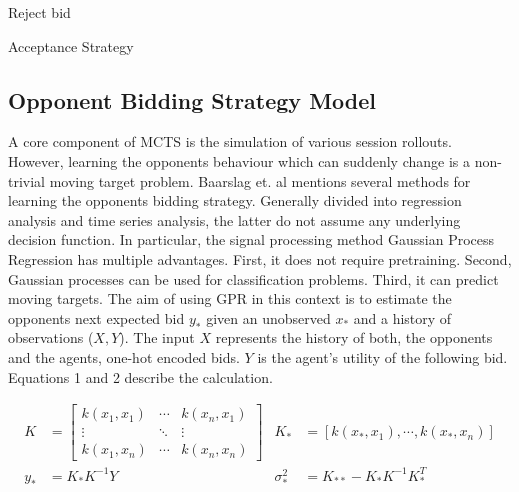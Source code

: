 \documentclass[a4paper,11pt]{article}
\theoremstyle{mytheor}
\begin{document}
\begin{algorithm}[H]
\SetAlgoNoEnd\SetAlgoNoLine
{}%
{Reject bid}
\caption{Acceptance Strategy}\label{alg:IR}
\end{algorithm}

\subsection{Opponent Bidding Strategy Model}
\label{sec:OBS}
A core component of MCTS is the simulation of various session rollouts. However, learning the opponents behaviour which can suddenly change is a non-trivial moving target problem.\cite{Baarslag2016} Baarslag et. al mentions several methods for learning the opponents bidding strategy.\cite{Baarslag2016} Generally divided into regression analysis and time series analysis, the latter do not assume any underlying decision function. In particular, the signal processing method Gaussian Process Regression has multiple advantages. First, it does not require pretraining. Second, Gaussian processes can be used for classification problems. Third, it can predict moving targets. The aim of using GPR in this context is to estimate the opponents next expected bid $y_*$ given an unobserved $x_*$ and a history of observations ($X,Y$). The input $X$ represents the history of both, the opponents and the agents, one-hot encoded bids. $Y$ is the agent's utility of the following bid. Equations 1 and 2 describe the calculation.\cite{Buron_Guessoum_Ductor_2019}

\begin{align}
    \label{eq:GPR}
    K &= \begin{bmatrix}
    k(x_1,x_1)&\cdots &k(x_n,x_1) \\
    \vdots & \ddots & \vdots\\
    k(x_1,x_n)&\cdots &k(x_n,x_n)
    \end{bmatrix} & K_* &= [k(x_*,x_1), \cdots, k(x_*,x_n)]\\
    y_* &= K_*K^{-1}Y &\sigma_*^2 &= K_{**} - K_* K^{-1} K_*^T
\end{align}
\end{document}

